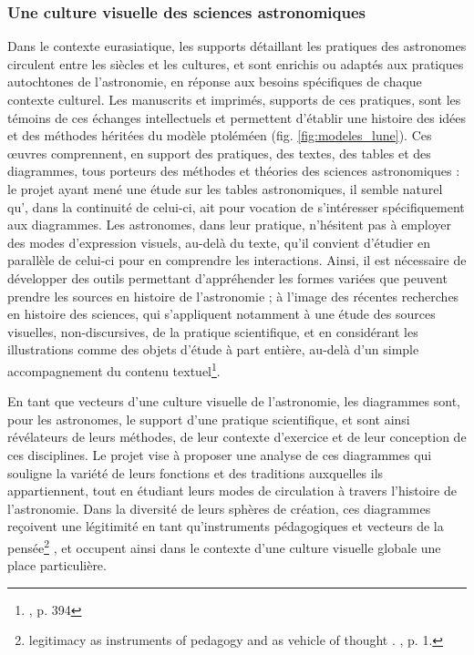     \subsubsection{Une culture visuelle des sciences astronomiques}
	Dans le contexte eurasiatique, les supports détaillant les pratiques des astronomes circulent entre les siècles et les cultures, et sont enrichis ou adaptés aux pratiques autochtones de l'astronomie, en réponse aux besoins spécifiques de chaque contexte culturel. Les manuscrits et imprimés, supports de ces pratiques, sont les témoins de ces échanges intellectuels et permettent d'établir une histoire des idées et des méthodes héritées du modèle ptoléméen (fig. \ref{fig:modeles_lune}). Ces œuvres comprennent, en support des pratiques, des textes, des tables et des diagrammes, tous porteurs des méthodes et théories des sciences astronomiques : le projet \dishas ayant mené une étude sur les tables astronomiques, il semble naturel qu'\eida, dans la continuité de celui-ci, ait pour vocation de s'intéresser spécifiquement aux diagrammes. Les astronomes, dans leur pratique, n'hésitent pas à employer des modes d'expression visuels, au-delà du texte, qu'il convient d'étudier en parallèle de celui-ci pour en comprendre les interactions. Ainsi, il est nécessaire de développer des outils permettant d'appréhender les formes variées que peuvent prendre les sources en histoire de l'astronomie ; à l'image des récentes recherches en histoire des sciences, qui s'appliquent notamment à une étude des sources visuelles, non-discursives, de la pratique scientifique, et en considérant les illustrations comme des objets d'étude à part entière, au-delà d'un simple accompagnement du contenu textuel\footnote{\cite{jardineCriticalEditingEarlyModern2010}, p. 394}.
	
	En tant que vecteurs d'une culture visuelle de l'astronomie, les diagrammes sont, pour les astronomes, le support d'une pratique scientifique, et sont ainsi révélateurs de leurs méthodes, de leur contexte d'exercice et de leur conception de ces disciplines. Le projet vise à proposer une analyse de ces diagrammes qui souligne la variété de leurs fonctions et des traditions auxquelles ils appartiennent, tout en étudiant leurs modes de circulation à travers l'histoire de l'astronomie. Dans la diversité de leurs sphères de création, ces diagrammes reçoivent \og une légitimité en tant qu'instruments pédagogiques et vecteurs de la pensée\footnote{\og [...] legitimacy as instruments of pedagogy and as vehicle of thought \fg. \cite{hamburgerDiagramParadigmCrossCultural2022}, p. 1.}  \fg, et occupent ainsi dans le contexte d'une culture visuelle globale une place particulière.

